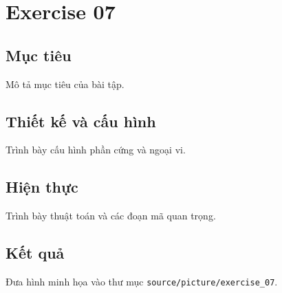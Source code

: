\chapter{Exercise 07}
\section{Mục tiêu}
Mô tả mục tiêu của bài tập.
\section{Thiết kế và cấu hình}
Trình bày cấu hình phần cứng và ngoại vi.
\section{Hiện thực}
Trình bày thuật toán và các đoạn mã quan trọng.
\section{Kết quả}
Đưa hình minh họa vào thư mục \texttt{source/picture/exercise\_07}.
